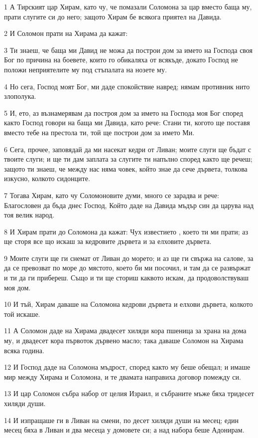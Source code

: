 \par 1 А Тирският цар Хирам, като чу, че помазали Соломона за цар вместо баща му, прати слугите си до него; защото Хирам бе всякога приятел на Давида.
\par 2 И Соломон прати на Хирама да кажат:
\par 3 Ти знаеш, че баща ми Давид не можа да построи дом за името на Господа своя Бог по причина на боевете, които го обикаляха от всякъде, докато Господ не положи неприятелите му под стъпалата на нозете му.
\par 4 Но сега, Господ моят Бог, ми даде спокойствие навред; нямам противник нито злополука.
\par 5 И, ето, аз възнамерявам да построя дом за името на Господа моя Бог според както Господ говори на баща ми Давида, като рече: Стани ти, когото ще поставя вместо тебе на престола ти, той ще построи дом за името Ми.
\par 6 Сега, прочее, заповядай да ми насекат кедри от Ливан; моите слуги ще бъдат с твоите слуги; и ще ти дам заплата за слугите ти напълно според както ще речеш; защото ти знаеш, че между нас няма човек, който знае да сече дървета, толкова изкусно, колкото сидонците.
\par 7 Тогава Хирам, като чу Соломоновите думи, много се зарадва и рече: Благословен да бъда днес Господ, Който даде на Давида мъдър син да царува над тоя велик народ.
\par 8 И Хирам прати до Соломона да кажат: Чух известието , което ти ми прати; аз ще сторя все що искаш за кедровите дървета и за елховите дървета.
\par 9 Моите слуги ще ги снемат от Ливан до морето; и аз ще ги свържа на салове, за да се превозват по море до мястото, което би ми посочил, и там да се развържат и ти да ги прибереш. Също и ти ще сториш каквото искам, да продоволствуваш моя дом.
\par 10 И тъй, Хирам даваше на Соломона кедрови дървета и елхови дървета, колкото той искаше.
\par 11 А Соломон даде на Хирама двадесет хиляди кора пшеница за храна на дома му, и двадесет кора първоток дървено масло; така даваше Соломон на Хирама всяка година.
\par 12 И Господ даде на Соломона мъдрост, според както му беше обещал; и имаше мир между Хирама и Соломона, и те двамата направиха договор помежду си.
\par 13 И цар Соломон събра набор от целия Израил, и събраните мъже бяха тридесет хиляди души.
\par 14 И изпращаше ги в Ливан на смени, по десет хиляди души на месец; един месец бяха в Ливан и два месеца у домовете си; а над набора беше Адонирам.
